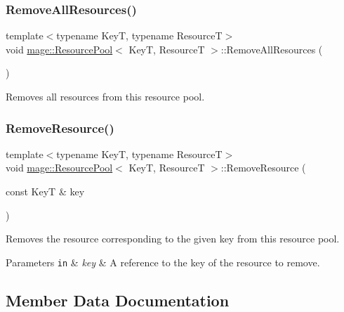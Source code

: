 \subsubsection{\texorpdfstring{Remove\+All\+Resources()}{RemoveAllResources()}}
{\footnotesize\ttfamily template$<$typename KeyT, typename ResourceT$>$ \\
void \hyperlink{classmage_1_1_resource_pool}{mage\+::\+Resource\+Pool}$<$ KeyT, ResourceT $>$\+::Remove\+All\+Resources (\begin{DoxyParamCaption}{ }\end{DoxyParamCaption})}

Removes all resources from this resource pool. \hypertarget{classmage_1_1_resource_pool_a56680a516f219bcf69bf5c8aaebdfeed}{}\label{classmage_1_1_resource_pool_a56680a516f219bcf69bf5c8aaebdfeed} 
\subsubsection{\texorpdfstring{Remove\+Resource()}{RemoveResource()}}
{\footnotesize\ttfamily template$<$typename KeyT, typename ResourceT$>$ \\
void \hyperlink{classmage_1_1_resource_pool}{mage\+::\+Resource\+Pool}$<$ KeyT, ResourceT $>$\+::Remove\+Resource (\begin{DoxyParamCaption}\item[{const KeyT \&}]{key }\end{DoxyParamCaption})}

Removes the resource corresponding to the given key from this resource pool.


\begin{DoxyParams}[1]{Parameters}
\mbox{\tt in}  & {\em key} & A reference to the key of the resource to remove. \\
\hline
\end{DoxyParams}


\subsection{Member Data Documentation}
\hypertarget{classmage_1_1_resource_pool_aecc46ecca2a54ef2816137276b1d73cd}{}\label{classmage_1_1_resource_pool_aecc46ecca2a54ef2816137276b1d73cd} 

